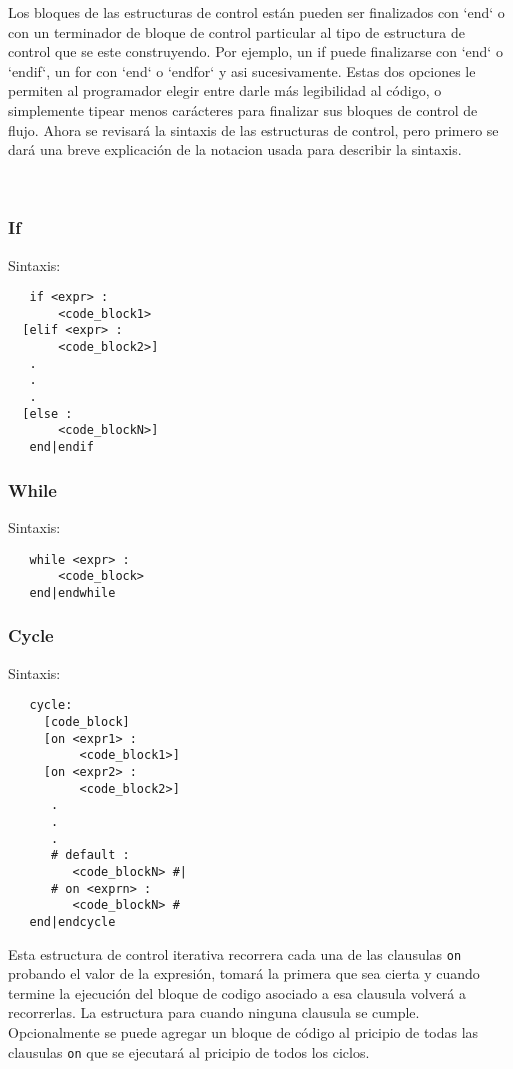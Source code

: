 \documentclass[12pt, spanish]{report}
\begin{document}
Los bloques de las estructuras de control est\'an pueden ser finalizados
con `end` o con un terminador de bloque de control particular al tipo de
estructura de control que se este construyendo. Por ejemplo, un if puede
finalizarse con `end` o `endif`, un for con `end` o `endfor` y asi
sucesivamente.
Estas dos opciones le permiten al programador elegir entre darle m\'as
legibilidad al c\'odigo, o simplemente tipear menos car\'acteres para
finalizar sus bloques de control de flujo.
Ahora se revisar\'a la sintaxis de las estructuras de control, pero
primero se dar\'a una breve explicaci\'on de la notacion usada para
describir la sintaxis.
\begin{itemize}\
\end{itemize}

\subsubsection{If}
Sintaxis:
\begin{verbatim}
   if <expr> :
       <code_block1>
  [elif <expr> :
       <code_block2>]
   .
   .
   .
  [else :
       <code_blockN>]
   end|endif
\end{verbatim}

\subsubsection{While}
Sintaxis:
\begin{verbatim}
   while <expr> :
       <code_block>
   end|endwhile
\end{verbatim}

\subsubsection{Cycle}
Sintaxis:
\begin{verbatim}
   cycle:
     [code_block]
     [on <expr1> :
          <code_block1>]
     [on <expr2> :
          <code_block2>]
      .
      .
      .
      # default :
         <code_blockN> #|
      # on <exprn> : 
         <code_blockN> #
   end|endcycle
\end{verbatim}
Esta estructura de control iterativa recorrera cada una de las clausulas
\texttt{on} probando el valor de la expresi\'on, tomar\'a la primera que sea cierta
y cuando termine la ejecuci\'on del bloque de codigo asociado a esa
clausula volver\'a a recorrerlas. La estructura para cuando ninguna
clausula se cumple. Opcionalmente se puede agregar un bloque de c\'odigo
al pricipio de todas las clausulas \texttt{on} que se ejecutar\'a al
pricipio de todos los ciclos.
\end{document}
